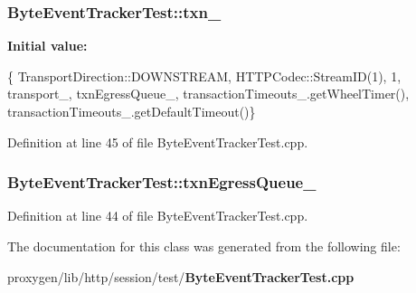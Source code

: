 \subsubsection[{txn\+\_\+}]{ Byte\+Event\+Tracker\+Test\+::txn\+\_\+\hspace{0.3cm}{\ttfamily [protected]}}\label{classByteEventTrackerTest_ab771899d98eda449aa48a53656b34f3f}
{\bfseries Initial value\+:}
\begin{DoxyCode}
\{
    TransportDirection::DOWNSTREAM,
      HTTPCodec::StreamID(1), 1, transport_,
      txnEgressQueue_, transactionTimeouts_.getWheelTimer(),
      transactionTimeouts_.getDefaultTimeout()\}
\end{DoxyCode}


Definition at line 45 of file Byte\+Event\+Tracker\+Test.\+cpp.

\subsubsection[{txn\+Egress\+Queue\+\_\+}]{ Byte\+Event\+Tracker\+Test\+::txn\+Egress\+Queue\+\_\+\hspace{0.3cm}{\ttfamily [protected]}}\label{classByteEventTrackerTest_a035ebc82fae6cc2aabcd6f3dd0184b76}


Definition at line 44 of file Byte\+Event\+Tracker\+Test.\+cpp.



The documentation for this class was generated from the following file\+:\begin{DoxyCompactItemize}
\item 
proxygen/lib/http/session/test/{\bf Byte\+Event\+Tracker\+Test.\+cpp}\end{DoxyCompactItemize}
